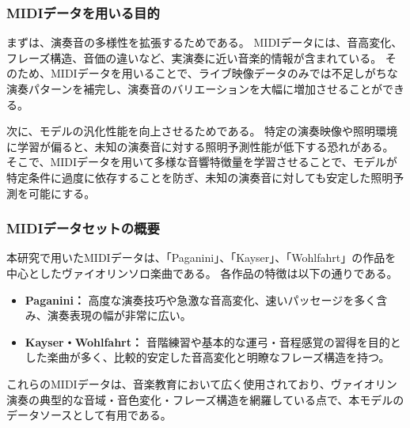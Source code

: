 \subsubsection{MIDIデータを用いる目的}

まずは、演奏音の多様性を拡張するためである。
MIDIデータには、音高変化、フレーズ構造、音価の違いなど、実演奏に近い音楽的情報が含まれている。
そのため、MIDIデータを用いることで、ライブ映像データのみでは不足しがちな演奏パターンを補完し、演奏音のバリエーションを大幅に増加させることができる。

次に、モデルの汎化性能を向上させるためである。
特定の演奏映像や照明環境に学習が偏ると、未知の演奏音に対する照明予測性能が低下する恐れがある。
そこで、MIDIデータを用いて多様な音響特徴量を学習させることで、モデルが特定条件に過度に依存することを防ぎ、未知の演奏音に対しても安定した照明予測を可能にする。

\subsubsection{MIDIデータセットの概要}

本研究で用いたMIDIデータは、「Paganini\cite{Paganini24Violin}」、「Kayser\cite{36ViolinStudies}」、「Wohlfahrt\cite{FreeSheetMusic}」の作品を中心としたヴァイオリンソロ楽曲である。
各作品の特徴は以下の通りである。

\begin{itemize}
	\item \textbf{Paganini：}
	    高度な演奏技巧や急激な音高変化、速いパッセージを多く含み、演奏表現の幅が非常に広い。
	\item \textbf{Kayser・Wohlfahrt：}
        音階練習や基本的な運弓・音程感覚の習得を目的とした楽曲が多く、比較的安定した音高変化と明瞭なフレーズ構造を持つ。
\end{itemize}

これらのMIDIデータは、音楽教育において広く使用されており、ヴァイオリン演奏の典型的な音域・音色変化・フレーズ構造を網羅している点で、本モデルのデータソースとして有用である。

